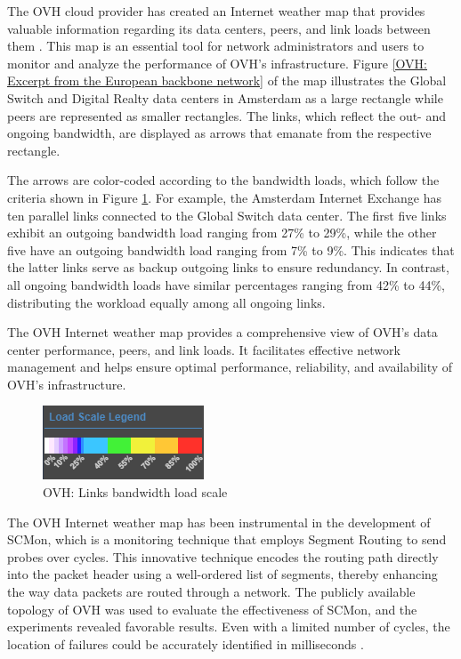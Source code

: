 \documentclass[sigconf,authorversion,nonacm]{acmart}
\begin{document}
The OVH cloud provider has created an Internet weather map that provides valuable information regarding its data centers, peers, and link loads between them \cite{ovhcloud}. This map is an essential tool for network administrators and users to monitor and analyze the performance of OVH's infrastructure. Figure \ref{OVH: Excerpt from the European backbone network} of the map illustrates the Global Switch and Digital Realty data centers in Amsterdam as a large rectangle while peers are represented as smaller rectangles. The links, which reflect the out- and ongoing bandwidth, are displayed as arrows that emanate from the respective rectangle. 

The arrows are color-coded according to the bandwidth loads, which follow the criteria shown in Figure \ref{OVH: Links bandwidth load scale}. For example, the Amsterdam Internet Exchange has ten parallel links connected to the Global Switch data center. The first five links exhibit an outgoing bandwidth load ranging from 27\% to 29\%, while the other five have an outgoing bandwidth load ranging from 7\% to 9\%. This indicates that the latter links serve as backup outgoing links to ensure redundancy. In contrast, all ongoing bandwidth loads have similar percentages ranging from 42\% to 44\%, distributing the workload equally among all ongoing links. 

The OVH Internet weather map provides a comprehensive view of OVH's data center performance, peers, and link loads. It facilitates effective network management and helps ensure optimal performance, reliability, and availability of OVH's infrastructure.

\begin{figure}
    \centering
    \includegraphics{OVH/scale.png}
    \caption{OVH: Links bandwidth load scale}
    \label{OVH: Links bandwidth load scale}
\end{figure}

The OVH Internet weather map has been instrumental in the development of SCMon, which is a monitoring technique that employs Segment Routing to send probes over cycles. This innovative technique encodes the routing path directly into the packet header using a well-ordered list of segments, thereby enhancing the way data packets are routed through a network. The publicly available topology of OVH was used to evaluate the effectiveness of SCMon, and the experiments revealed favorable results. Even with a limited number of cycles, the location of failures could be accurately identified in milliseconds \cite{7524410}.
\end{document}
